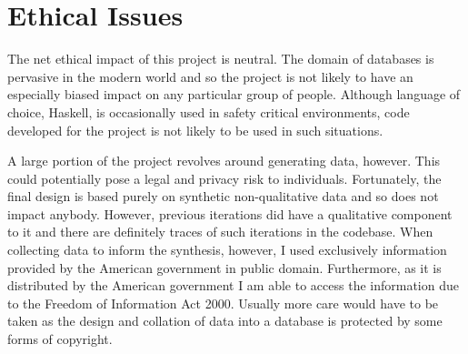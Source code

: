 \chapter*{Ethical Issues}
\begin{comment}
You are required to include a short discussion of ethical, legal, societal and professional issues that are relevant to your project (usually 1 to 2 pages long). This should fit in the most appropriate section of your project report, often the Background or Conclusions section.
\end{comment}
The net ethical impact of this project is neutral. The domain of databases is
pervasive in the modern world and so the project is not likely to have an
especially biased impact on any particular group of people. Although language of
choice, Haskell, is occasionally used in safety critical environments, code
developed for the project is not likely to be used in such situations.

A large portion of the project revolves around generating data, however. This
could potentially pose a legal and privacy risk to individuals. Fortunately, the
final design is based purely on synthetic non-qualitative data and so does not
impact anybody. However, previous iterations did have a qualitative component to
it and there are definitely traces of such iterations in the codebase. When
collecting data to inform the synthesis, however, I used exclusively
information provided by the American government in public domain. Furthermore,
as it is distributed by the American government I am able to access the
information due to the Freedom of Information Act 2000. Usually more care would
have to be taken as the design and collation of data into a database is
protected by some forms of copyright.
